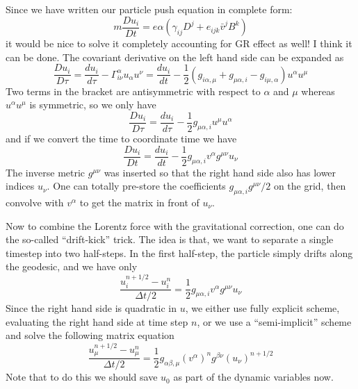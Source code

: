 Since we have written our particle push equation in complete form:
\begin{equation}
  \label{eq:51}
  m\frac{Du_i}{Dt} = e\alpha (\gamma_{ij}D^j + e_{ijk}\bar{v}^jB^k)
\end{equation}
it would be nice to solve it completely accounting for GR effect as well! I
think it can be done. The covariant derivative on the left hand side can be
expanded as
\begin{equation}
  \label{eq:52}
  \frac{Du_i}{D\tau} = \frac{du_i}{d\tau} - \Gamma^{\alpha}_{i\nu}u_{\alpha}u^{\nu} = \frac{du_i}{dt} - \frac{1}{2}\left( g_{i\alpha,\mu} + g_{\mu\alpha,i} - g_{i\mu,\alpha} \right)u^{\alpha}u^{\mu}
\end{equation}
Two terms in the bracket are antisymmetric with respect to $\alpha$ and $\mu$
whereas $u^{\alpha}u^{\mu}$ is symmetric, so we only have
\begin{equation}
  \label{eq:53}
  \frac{Du_i}{D\tau} = \frac{du_i}{d\tau} - \frac{1}{2}g_{\mu\alpha,i}u^{\mu}u^{\alpha}
\end{equation}
and if we convert the time to coordinate time we have
\begin{equation}
  \label{eq:54}
  \frac{Du_i}{Dt} = \frac{du_i}{dt} - \frac{1}{2}g_{\mu\alpha,i}v^{\alpha}g^{\mu\nu}u_{\nu}
\end{equation}
The inverse metric $g^{\mu\nu}$ was inserted so that the right hand side also
has lower indices $u_{\nu}$. One can totally pre-store the coefficients
$g_{\mu\alpha,i}g^{\mu\nu}/2$ on the grid, then convolve with $v^{\alpha}$ to
get the matrix in front of $u_{\nu}$.

Now to combine the Lorentz force with the gravitational correction, one can do
the so-called ``drift-kick'' trick. The idea is that, we want to separate a
single timestep into two half-steps. In the first half-step, the particle simply
drifts along the geodesic, and we have only
\begin{equation}
  \label{eq:55}
  \frac{u_i^{n+1/2} - u_i^n}{\Delta t/2} = \frac{1}{2}g_{\mu\alpha,i}v^{\alpha}g^{\mu\nu}u_{\nu}
\end{equation}
Since the right hand side is quadratic in $u$, we either use fully explicit
scheme, evaluating the right hand side at time step $n$, or we use a
``semi-implicit'' scheme and solve the following matrix equation
\begin{equation}
  \label{eq:56}
  \frac{u_{\mu}^{n+1/2} - u_{\mu}^n}{\Delta t/2} = \frac{1}{2}g_{\alpha\beta,\mu}(v^{\alpha})^ng^{\beta\nu}(u_{\nu})^{n+1/2}
\end{equation}
Note that to do this we should save $u_0$ as part of the dynamic variables now.

